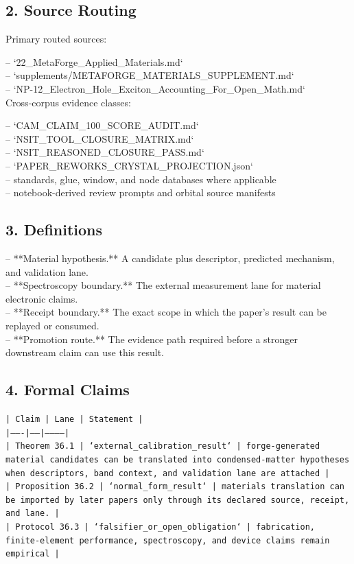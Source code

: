 \documentclass[11pt]{article}
\begin{document}
\subsection*{2. Source Routing}

Primary routed sources:

\noindent{}-- `22\_MetaForge\_Applied\_Materials.md`\\
\noindent{}-- `supplements/METAFORGE\_MATERIALS\_SUPPLEMENT.md`\\
\noindent{}-- `NP-12\_Electron\_Hole\_Exciton\_Accounting\_For\_Open\_Math.md`\\

Cross-corpus evidence classes:

\noindent{}-- `CAM\_CLAIM\_100\_SCORE\_AUDIT.md`\\
\noindent{}-- `NSIT\_TOOL\_CLOSURE\_MATRIX.md`\\
\noindent{}-- `NSIT\_REASONED\_CLOSURE\_PASS.md`\\
\noindent{}-- `PAPER\_REWORKS\_CRYSTAL\_PROJECTION.json`\\
\noindent{}-- standards, glue, window, and node databases where applicable\\
\noindent{}-- notebook-derived review prompts and orbital source manifests\\

\subsection*{3. Definitions}

\noindent{}-- **Material hypothesis.** A candidate plus descriptor, predicted mechanism, and validation lane.\\
\noindent{}-- **Spectroscopy boundary.** The external measurement lane for material electronic claims.\\
\noindent{}-- **Receipt boundary.** The exact scope in which the paper's result can be replayed or consumed.\\
\noindent{}-- **Promotion route.** The evidence path required before a stronger downstream claim can use this result.\\

\subsection*{4. Formal Claims}

\noindent\texttt{| Claim | Lane | Statement |}\\
\noindent\texttt{|-------|------|-----------|}\\
\noindent\texttt{| Theorem 36.1 | `external\_calibration\_result` | forge-generated material candidates can be translated into condensed-matter hypotheses when descriptors, band context, and validation lane are attached |}\\
\noindent\texttt{| Proposition 36.2 | `normal\_form\_result` | materials translation can be imported by later papers only through its declared source, receipt, and lane. |}\\
\noindent\texttt{| Protocol 36.3 | `falsifier\_or\_open\_obligation` | fabrication, finite-element performance, spectroscopy, and device claims remain empirical |}\\
\end{document}
